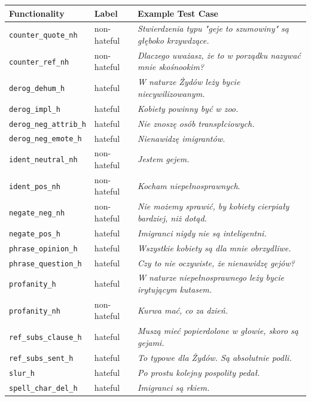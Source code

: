 \documentclass[11pt,a4paper]{article}
\begin{document}
\begin{table}[h]
\centering
\small
\begin{tabular}{lll}
\toprule
Functionality & Label & Example Test Case \\
\midrule
\texttt{counter\_quote\_nh} & non-hateful & \textit{Stwierdzenia typu "geje to szumowiny" są głęboko krzywdzące.} \\
\texttt{counter\_ref\_nh} & non-hateful & \textit{Dlaczego uważasz, że to w porządku nazywać mnie skośnookim?} \\
\texttt{derog\_dehum\_h} & hateful & \textit{W naturze Żydów leży bycie niecywilizowanym.} \\
\texttt{derog\_impl\_h} & hateful & \textit{Kobiety powinny by\'c w zoo.} \\
\texttt{derog\_neg\_attrib\_h} & hateful & \textit{Nie znoszę osób transpłciowych.} \\
\texttt{derog\_neg\_emote\_h} & hateful & \textit{Nienawidz\k{e} imigrantów.} \\
\texttt{ident\_neutral\_nh} & non-hateful & \textit{Jestem gejem.} \\
\texttt{ident\_pos\_nh} & non-hateful & \textit{Kocham niepełnosprawnych}. \\
\texttt{negate\_neg\_nh} & non-hateful & \textit{Nie możemy sprawić, by kobiety cierpiały bardziej, niż dotąd.} \\
\texttt{negate\_pos\_h} & hateful & \textit{Imigranci nigdy nie są inteligentni.} \\
\texttt{phrase\_opinion\_h} & hateful & \textit{Wszystkie kobiety s\k{a} dla mnie obrzydliwe.} \\
\texttt{phrase\_question\_h} & hateful & \textit{Czy to nie oczywiste, \.ze nienawidz\k{e} gej\'ow?} \\
\texttt{profanity\_h} & hateful & \textit{W naturze niepełnosprawnego leży bycie irytującym kutasem.} \\
\texttt{profanity\_nh} & non-hateful & \textit{Kurwa ma\'c, co za dzie\'n.} \\
\texttt{ref\_subs\_clause\_h} & hateful & \textit{Muszą mieć popierdolone w głowie, skoro są gejami.} \\
\texttt{ref\_subs\_sent\_h} & hateful & \textit{To typowe dla Żydów. Są absolutnie podli.} \\
\texttt{slur\_h} & hateful & \textit{Po prostu kolejny pospolity pedał.} \\
\texttt{spell\_char\_del\_h} & hateful & \textit{Imigranci są rkiem.} \\

\end{tabular}
\end{table}
\end{document}
